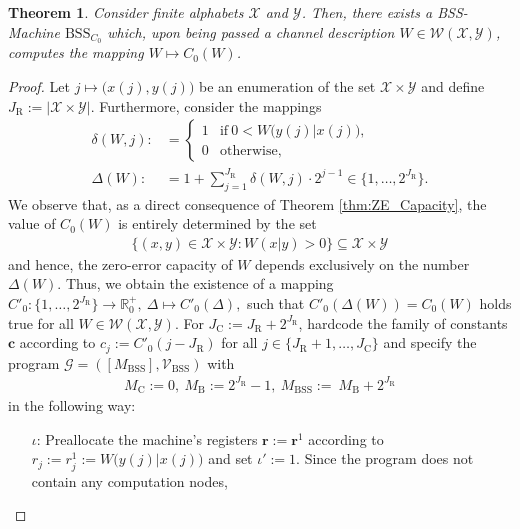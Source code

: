 \documentclass[conference]{IEEEtran}
\def\X{{\mathcal X}}
\def\Y{{\mathcal Y}}
\def\G{{\mathcal G}}
\def\V{{\mathcal V}}
\def\W{{\mathcal W}}
\def\RR{{\mathbb R}}
\newcommand{\BSS}{\mathrm{BSS}}
\newtheorem{Theorem}{Theorem}
\begin{document}
	\begin{Theorem}	\label{thm:ZeroErrorBSScomputable}
					Consider finite alphabets \(\X\) and \(\Y\). Then, there exists a BSS-Machine \(\BSS_{C_0}\)
					which, upon being passed a channel description \(W\in \W(\X,\Y)\), computes the mapping \(W \mapsto C_0(W)\).
	\end{Theorem}\begin{proof}
					Let \(j \mapsto \big(x(j), y(j)\big)\) be an enumeration of the set \(\X\times\Y\) and define
					\(J_\mathrm{R} := |\X\times \Y|\). Furthermore, consider the mappings
					\begin{align*}	\delta(W,j) :&=     \begin{cases}   1   &\text{if}~ 0 < W\big(y(j)|x(j)\big), \\
																		0   &\text{otherwise},
														\end{cases}\\
									\Delta(W)   :&=     1 + {\sum}_{j=1}^{J_\mathrm{R}} \delta(W,j)\cdot 2^{j-1} \in \big\{1,\ldots,2^{J_\mathrm{R}}\big\}.
					\end{align*} 
					We observe that, as a direct consequence of Theorem \ref{thm:ZE_Capacity}, the value of \(C_0(W)\) is 
					entirely determined by the set 
					\begin{align*}   \{(x,y) \in \X\times \Y : W(x|y) > 0\} \subseteq \X\times\Y
					\end{align*} 
					and hence, the zero-error capacity of \(W\) depends exclusively on the number \(\Delta(W)\). Thus, we obtain the existence of a mapping
					\(C'_0 : \big\{1,\ldots,2^{J_\mathrm{R}}\big\} \rightarrow \RR_0^+,~ \Delta \mapsto C'_0(\Delta),        
					\)
					such that \(C'_0(\Delta(W)) = C_0(W)\) holds true for all \(W\in\W(\X,\Y)\). For \(J_\mathrm{C} := J_\mathrm{R} + 2^{J_\mathrm{R}}\), 
					hardcode the family of constants \(\bm{c}\) according to 
					\(  c_j := C'_0(j - J_\mathrm{R})
					\)
					for all \(j\in \{J_\mathrm{R} + 1, \ldots, J_\mathrm{C}\}\) and specify the program \(\G = ([M_\BSS],\V_\BSS)\) with
					\begin{align*}	M_\mathrm{C} := 0,~M_\mathrm{B} := 2^{J_\mathrm{R}} - 1,~ M_\BSS := ~M_\mathrm{B} + 2^{J_\mathrm{R}}
					\end{align*}
					in the following way:
					\begin{enumerate}	\item[\(\iota\)\hspace{1pt}:] Preallocate the machine's registers \(\bm{r} := \bm{r}^1\) according to
											\(r_j := r^1_j := W\big(y(j)|x(j)\big)\) and set \(\iota' := 1\). Since the program does not contain any computation nodes,

\end{enumerate}
\end{proof}
\end{document}

